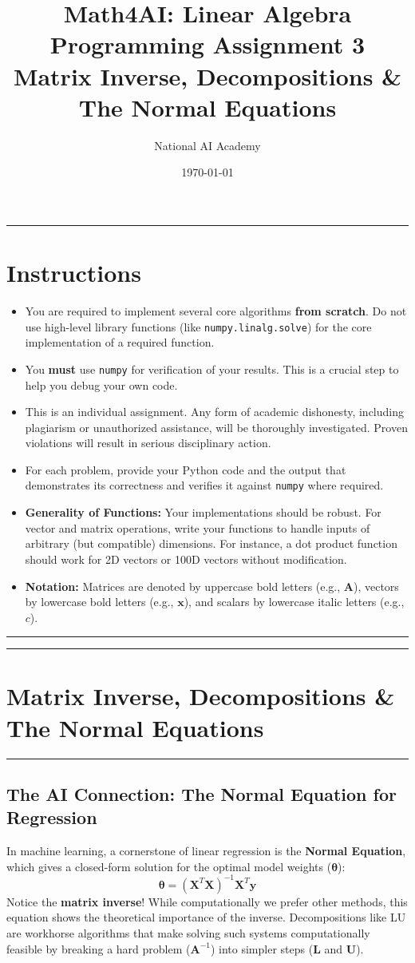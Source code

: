 \documentclass[12pt]{article}
\title{\textbf{Math4AI: Linear Algebra \\ Programming Assignment 3} \\ \large \vspace{5 mm}Matrix Inverse, Decompositions \& The Normal Equations}
\author{National AI Academy}
\date{\today}
\begin{document}
\maketitle
\hrule

\section*{Instructions}

\begin{itemize}
    \item You are required to implement several core algorithms \textbf{from scratch}. Do not use high-level library functions (like \texttt{numpy.linalg.solve}) for the core implementation of a required function.
    \item You \textbf{must} use \texttt{numpy} for verification of your results. This is a crucial step to help you debug your own code.
    \item  This is an individual assignment. Any form of academic dishonesty, including plagiarism or unauthorized assistance, will be thoroughly investigated. Proven violations will result in serious disciplinary action.
    \item For each problem, provide your Python code and the output that demonstrates its correctness and verifies it against \texttt{numpy} where required.
    \item \textbf{Generality of Functions:} Your implementations should be robust. For vector and matrix operations, write your functions to handle inputs of arbitrary (but compatible) dimensions. For instance, a dot product function should work for 2D vectors or 100D vectors without modification.
    \item \textbf{Notation:} Matrices are denoted by uppercase bold letters (e.g., $\mathbf{A}$), vectors by lowercase bold letters (e.g., $\mathbf{x}$), and scalars by lowercase italic letters (e.g., $c$).
\end{itemize}

\hrule\vspace{1em}

\newpage
\hrule
\section*{Matrix Inverse, Decompositions \& The Normal Equations}
\hrule\vspace{0.5em}

\subsection*{The AI Connection: The Normal Equation for Regression}
In machine learning, a cornerstone of linear regression is the \textbf{Normal Equation}, which gives a closed-form solution for the optimal model weights ($\boldsymbol{\theta}$):
$$ \boldsymbol{\theta} = (\mathbf{X}^T \mathbf{X})^{-1} \mathbf{X}^T \mathbf{y} $$
Notice the \textbf{matrix inverse}! While computationally we prefer other methods, this equation shows the theoretical importance of the inverse. Decompositions like LU are workhorse algorithms that make solving such systems computationally feasible by breaking a hard problem ($\mathbf{A}^{-1}$) into simpler steps ($\mathbf{L}$ and $\mathbf{U}$).
\end{document}
